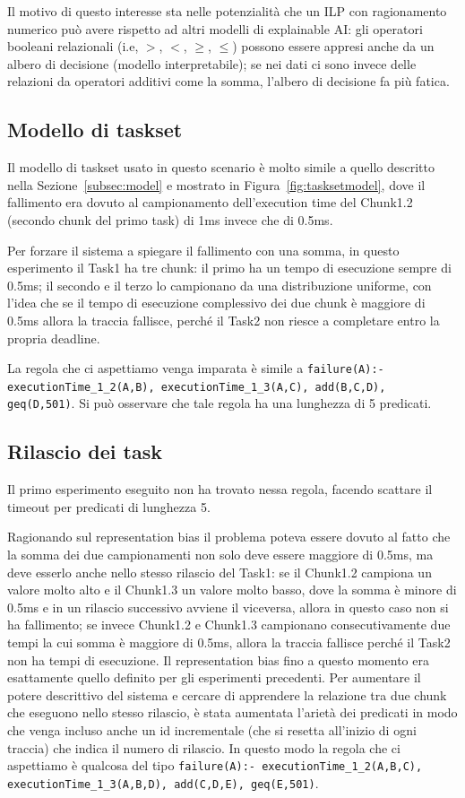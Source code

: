 Il motivo di questo interesse sta nelle potenzialità che un ILP con ragionamento numerico può avere rispetto ad altri modelli di explainable AI: gli operatori booleani relazionali (i.e, $>$, $<$, $\geq$, $\leq$) possono essere appresi anche da un albero di decisione (modello interpretabile); se nei dati ci sono invece delle relazioni da operatori additivi come la somma, l'albero di decisione fa più fatica.

\subsection{Modello di taskset}
Il modello di taskset usato in questo scenario è molto simile a quello descritto nella Sezione~\ref{subsec:model} e mostrato in Figura~\ref{fig:tasksetmodel}, dove il fallimento era dovuto al campionamento dell'execution time del Chunk1.2 (secondo chunk del primo task) di 1ms invece che di 0.5ms.

Per forzare il sistema a spiegare il fallimento con una somma, in questo esperimento il Task1 ha tre chunk: il primo ha un tempo di esecuzione sempre di 0.5ms; il secondo e il terzo lo campionano da una distribuzione uniforme, con l'idea che se il tempo di esecuzione complessivo dei due chunk è maggiore di 0.5ms allora la traccia fallisce, perché il Task2 non riesce a completare entro la propria deadline.

La regola che ci aspettiamo venga imparata è simile a \texttt{failure(A):- \\ executionTime\_1\_2(A,B), executionTime\_1\_3(A,C), add(B,C,D), geq(D,501)}. Si può osservare che tale regola ha una lunghezza di 5 predicati.

\subsection{Rilascio dei task}
Il primo esperimento eseguito non ha trovato nessa regola, facendo scattare il timeout per predicati di lunghezza 5.

Ragionando sul representation bias il problema poteva essere dovuto al fatto che la somma dei due campionamenti non solo deve essere maggiore di 0.5ms, ma deve esserlo anche nello stesso rilascio del Task1: se il Chunk1.2 campiona un valore molto alto e il Chunk1.3 un valore molto basso, dove la somma è minore di 0.5ms e in un rilascio successivo avviene il viceversa, allora in questo caso non si ha fallimento; se invece Chunk1.2 e Chunk1.3 campionano consecutivamente due tempi la cui somma è maggiore di 0.5ms, allora la traccia fallisce perché il Task2 non ha tempi di esecuzione. Il representation bias fino a questo momento era esattamente quello definito per gli esperimenti precedenti. Per aumentare il potere descrittivo del sistema e cercare di apprendere la relazione tra due chunk che eseguono nello stesso rilascio, è stata aumentata l'arietà dei predicati in modo che venga incluso anche un id incrementale (che si resetta all'inizio di ogni traccia) che indica il numero di rilascio. In questo modo la regola che ci aspettiamo è qualcosa del tipo \texttt{failure(A):- executionTime\_1\_2(A,B,C), executionTime\_1\_3(A,B,D), add(C,D,E), geq(E,501)}.

